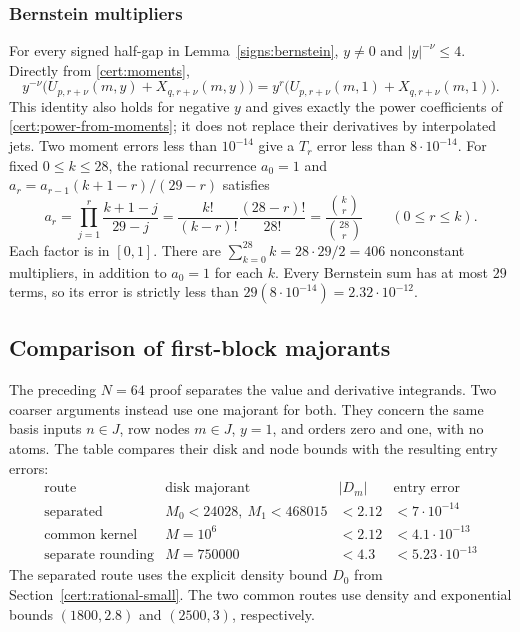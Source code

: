 \subsubsection{Bernstein multipliers}\label{ind:bernstein}
For every signed half-gap in Lemma~\ref{signs:bernstein}, $y\ne0$ and
$|y|^{-\nu}\le4$.  Directly from \eqref{cert:moments},
\[
 y^{-\nu}\bigl(U_{p,r+\nu}(m,y)+X_{q,r+\nu}(m,y)\bigr)
 =y^r\bigl(U_{p,r+\nu}(m,1)+X_{q,r+\nu}(m,1)\bigr).
\]
This identity also holds for negative $y$ and gives exactly the
power coefficients of \eqref{cert:power-from-moments}; it does not replace
their derivatives by interpolated jets.  Two moment errors less than
$10^{-14}$ give a $T_r$ error less than $8\cdot10^{-14}$.
For fixed $0\le k\le28$, the rational recurrence $a_0=1$ and
$a_r=a_{r-1}(k+1-r)/(29-r)$ satisfies
\begin{equation}\label{ind:bernstein-multiplier}
 a_r=\prod_{j=1}^r\frac{k+1-j}{29-j}
 =\frac{k!}{(k-r)!}\frac{(28-r)!}{28!}
 =\frac{\binom{k}{r}}{\binom{28}{r}}\qquad(0\le r\le k).
\end{equation}
Each factor is in $[0,1]$.  There are
$\sum_{k=0}^{28}k=28\cdot29/2=406$ nonconstant multipliers, in addition
to $a_0=1$ for each $k$.  Every Bernstein sum has at most $29$ terms,
so its error is strictly less than
$29(8\cdot10^{-14})=2.32\cdot10^{-12}$.



\subsection{Comparison of first-block majorants}\label{ind:small}

The preceding $N=64$ proof separates the value and derivative integrands.
Two coarser arguments instead use one majorant for both.  They concern the
same basis inputs $n\in J$, row nodes $m\in J$, $y=1$, and orders zero and
one, with no atoms.  The table compares their disk and node bounds with
the resulting entry errors:
\begingroup
\small
\[
\begin{array}{c|c|c|c}
 \text{route}&\text{disk majorant}&|D_m|&\text{entry error}\\ \hline
 \text{separated}&M_0<24028,\ M_1<468015&<2.12&<7\cdot10^{-14}\\
 \text{common kernel}&M=10^6&<2.12&<4.1\cdot10^{-13}\\
 \text{separate rounding}&M=750000&<4.3&<5.23\cdot10^{-13}
\end{array}
\]
\endgroup
The separated route uses the explicit density bound $D_0$ from
Section~\ref{cert:rational-small}.  The two common routes use density and
exponential bounds $(1800,2.8)$ and $(2500,3)$, respectively.

